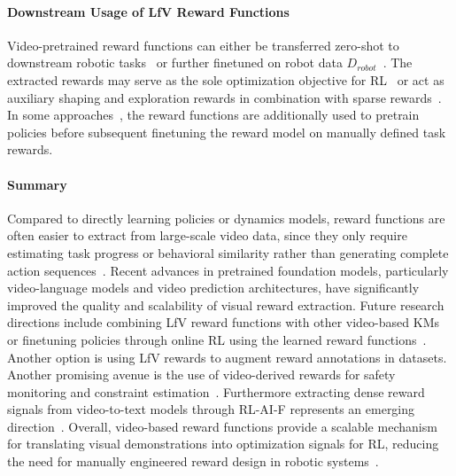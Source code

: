 \paragraph{Downstream Usage of LfV Reward Functions}

Video-pretrained reward functions can either be transferred zero-shot to downstream robotic tasks~\cite{Escontrela2023VideoPM} or further finetuned on robot data $D_{robot}$~\cite{Sontakke2023RoboCLIPOD}. The extracted rewards may serve as the sole optimization objective for \ac{RL}~\cite{McCarthy_2025} or act as auxiliary shaping and exploration rewards in combination with sparse rewards~\cite{Zhen20243DVLAA3, Chang2022LearningVF}. In some approaches~\cite{Adeniji2023LanguageRM}, the reward functions are additionally used to pretrain policies before subsequent finetuning the reward model on manually defined task rewards.


\paragraph{Summary}

Compared to directly learning policies or dynamics models, reward functions are often easier to extract from large-scale video data, since they only require estimating task progress or behavioral similarity rather than generating complete action sequences~\cite{McCarthy_2025}. 
Recent advances in pretrained foundation models, particularly video-language models and video prediction architectures, have significantly improved the quality and scalability of visual reward extraction.
Future research directions include combining \ac{LfV} reward functions with other video-based \acp{KM} or finetuning policies through online \ac{RL} using the learned reward functions~\cite{Hafner2023MasteringDD, JyothirS2023GradientbasedPW}. Another option is using \ac{LfV} rewards to augment reward annotations in datasets. Another promising avenue is the use of video-derived rewards for safety monitoring and constraint estimation~\cite{Guan2024TaskSI}. Furthermore extracting dense reward signals from video-to-text models through \acf{RL-AI-F} represents an emerging direction~\cite{Klissarov2023MotifIM}.
Overall, video-based reward functions provide a scalable mechanism for translating visual demonstrations into optimization signals for \ac{RL}, reducing the need for manually engineered reward design in robotic systems~\cite{McCarthy_2025}.









